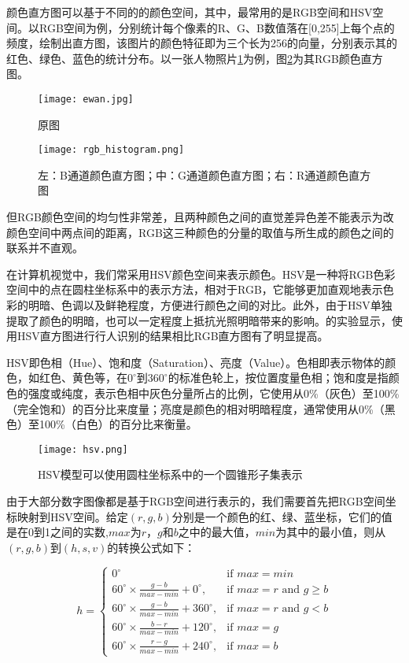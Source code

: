   颜色直方图可以基于不同的的颜色空间，其中，最常用的是RGB空间和HSV空间。以RGB空间为例，分别统计每个像素的R、G、B数值落在[0,255]上每个点的频度，绘制出直方图，该图片的颜色特征即为三个长为256的向量，分别表示其的红色、绿色、蓝色的统计分布。以一张人物照片\ref{fig:ewan}为例，图\ref{fig:rgbhistogram}为其RGB颜色直方图。

\begin{figure}[htb]
  \centering
  \texttt{[image: ewan.jpg]}
  \caption{原图}
  \label{fig:ewan}
\end{figure}

\begin{figure}[htb]
  \centering
  \texttt{[image: rgb\_histogram.png]}
  \caption{左：B通道颜色直方图；中：G通道颜色直方图；右：R通道颜色直方图}
  \label{fig:rgbhistogram}
\end{figure}

  但RGB颜色空间的均匀性非常差，且两种颜色之间的直觉差异色差不能表示为改颜色空间中两点间的距离，RGB这三种颜色的分量的取值与所生成的颜色之间的联系并不直观。

  在计算机视觉中，我们常采用HSV颜色空间来表示颜色。HSV是一种将RGB色彩空间中的点在圆柱坐标系中的表示方法，相对于RGB，它能够更加直观地表示色彩的明暗、色调以及鲜艳程度，方便进行颜色之间的对比。此外，由于HSV单独提取了颜色的明暗，也可以一定程度上抵抗光照明暗带来的影响。\citet{sural2002segmentation}的实验显示，使用HSV直方图进行行人识别的结果相比RGB直方图有了明显提高。

  HSV即色相（Hue）、饱和度（Saturation）、亮度（Value）。色相即表示物体的颜色，如红色、黄色等，在$0^{\circ}$到$360^{\circ}$的标准色轮上，按位置度量色相；饱和度是指颜色的强度或纯度，表示色相中灰色分量所占的比例，它使用从0\%（灰色）至100\%（完全饱和）的百分比来度量；亮度是颜色的相对明暗程度，通常使用从0\%（黑色）至100\%（白色）的百分比来衡量。

\begin{figure}[htb]
  \centering
  \texttt{[image: hsv.png]}
  \caption{HSV模型可以使用圆柱坐标系中的一个圆锥形子集表示}
  \label{fig:hsv}
\end{figure}

  由于大部分数字图像都是基于RGB空间进行表示的，我们需要首先把RGB空间坐标映射到HSV空间。给定$(r,g,b)$分别是一个颜色的红、绿、蓝坐标，它们的值是在0到1之间的实数,$max$为$r$，$g$和$b$之中的最大值，$min$为其中的最小值，则从$(r,g,b)$到$(h,s,v)$的转换公式如下：\cite{foley1982fundamentals}

$$h={\begin{cases}0^{\circ }&{\mbox{if }}max=min\\60^{\circ }\times {\frac  {g-b}{max-min}}+0^{\circ },&{\mbox{if }}max=r{\mbox{ and }}g\geq b\\60^{\circ }\times {\frac  {g-b}{max-min}}+360^{\circ },&{\mbox{if }}max=r{\mbox{ and }}g<b\\60^{\circ }\times {\frac  {b-r}{max-min}}+120^{\circ },&{\mbox{if }}max=g\\60^{\circ }\times {\frac  {r-g}{max-min}}+240^{\circ },&{\mbox{if }}max=b\end{cases}}$$

